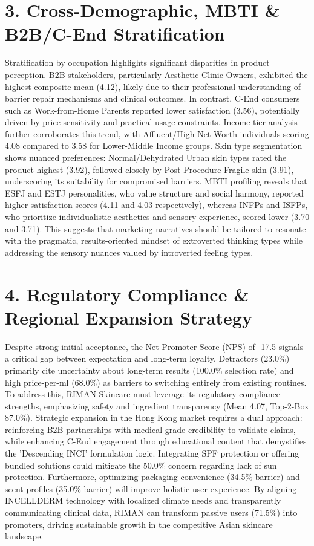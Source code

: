 \documentclass[10pt,twocolumn,a4paper]{article}
\begin{document}
\section{3. Cross-Demographic, MBTI \& B2B/C-End Stratification}
Stratification by occupation highlights significant disparities in product perception. B2B stakeholders, particularly Aesthetic Clinic Owners, exhibited the highest composite mean (4.12), likely due to their professional understanding of barrier repair mechanisms and clinical outcomes. In contrast, C-End consumers such as Work-from-Home Parents reported lower satisfaction (3.56), potentially driven by price sensitivity and practical usage constraints. Income tier analysis further corroborates this trend, with Affluent/High Net Worth individuals scoring 4.08 compared to 3.58 for Lower-Middle Income groups. Skin type segmentation shows nuanced preferences: Normal/Dehydrated Urban skin types rated the product highest (3.92), followed closely by Post-Procedure Fragile skin (3.91), underscoring its suitability for compromised barriers. MBTI profiling reveals that ESFJ and ESTJ personalities, who value structure and social harmony, reported higher satisfaction scores (4.11 and 4.03 respectively), whereas INFPs and ISFPs, who prioritize individualistic aesthetics and sensory experience, scored lower (3.70 and 3.71). This suggests that marketing narratives should be tailored to resonate with the pragmatic, results-oriented mindset of extroverted thinking types while addressing the sensory nuances valued by introverted feeling types.
\section{4. Regulatory Compliance \& Regional Expansion Strategy}
Despite strong initial acceptance, the Net Promoter Score (NPS) of -17.5 signals a critical gap between expectation and long-term loyalty. Detractors (23.0\%) primarily cite uncertainty about long-term results (100.0\% selection rate) and high price-per-ml (68.0\%) as barriers to switching entirely from existing routines. To address this, RIMAN Skincare must leverage its regulatory compliance strengths, emphasizing safety and ingredient transparency (Mean 4.07, Top-2-Box 87.0\%). Strategic expansion in the Hong Kong market requires a dual approach: reinforcing B2B partnerships with medical-grade credibility to validate claims, while enhancing C-End engagement through educational content that demystifies the 'Descending INCI' formulation logic. Integrating SPF protection or offering bundled solutions could mitigate the 50.0\% concern regarding lack of sun protection. Furthermore, optimizing packaging convenience (34.5\% barrier) and scent profiles (35.0\% barrier) will improve holistic user experience. By aligning INCELLDERM technology with localized climate needs and transparently communicating clinical data, RIMAN can transform passive users (71.5\%) into promoters, driving sustainable growth in the competitive Asian skincare landscape.
\end{document}
